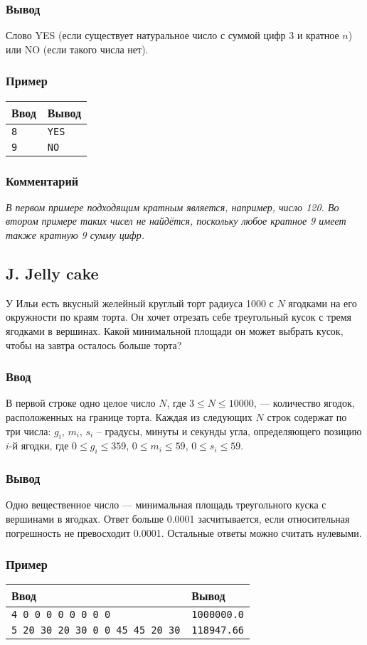 \documentclass[10pt, a4paper]{article}
\newcommand{\informat}[1]
{
	\subsubsection*{Ввод} #1
}
\newcommand{\outformat}[1]
{
	\subsubsection*{Вывод} #1
}
\newcommand{\examplee}[4]
{
	\subsubsection*{Пример}
	\noindent
	\begin{center}
	\begin{tabularx}{\linewidth}{|X|X|}
	\hline
	Ввод 	& Вывод  	\\
	\hline
	{\tt #1} & {\tt #2}	\\
	\hline
	{\tt #3} & {\tt #4}	\\
	\hline
	\end{tabularx}
	\end{center}
}
\newcommand{\excomm}[1]
{
	\subsubsection*{Комментарий}
	\textit{#1}
}
\begin{document}
\outformat{Слово YES (если существует натуральное число с суммой цифр 3 и кратное $n$) или NO (если такого числа нет).}

\examplee{8}{YES}{9}{NO}

\excomm{В первом примере подходящим кратным является, например, число 120. Во втором примере таких чисел не найдётся, поскольку любое кратное 9 имеет также кратную 9 сумму цифр.}



\subsection*{J. Jelly cake}

У Ильи есть вкусный желейный круглый торт радиуса 1000 с $N$ ягодками на его окружности по краям торта. Он хочет отрезать себе треугольный кусок с тремя ягодками в вершинах. Какой минимальной площади он может выбрать кусок, чтобы на завтра осталось больше торта?

\informat{В первой строке одно целое число $N$, где $3 \le N \le 10000$, --- количество ягодок, расположенных на границе торта. \newline Каждая из следующих $N$ строк содержат по три числа: $g_i$, $m_i$, $s_i$ -- градусы, минуты и секунды угла, определяющего позицию $i$-й ягодки, где $0 \le g_i \le 359$, $0 \le m_i \le 59$, $0 \le s_i \le 59$.}

\outformat{Одно вещественное число --- минимальная площадь треугольного куска с вершинами в ягодках. Ответ больше 0.0001 засчитывается, если относительная погрешность не превосходит 0.0001. Остальные ответы можно считать нулевыми.}

\examplee{4 \newline
0 0 0\newline
90 0 0\newline
180 0 0\newline
270 0 0}{1000000.0}
{5 \newline
180 20 30\newline
120 20 30\newline
0 0 0\newline
45 45 45\newline
90 20 30}{118947.66}
\end{document}
